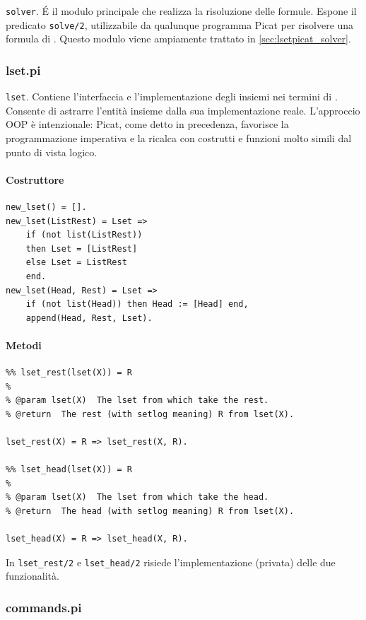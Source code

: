 \documentclass[12pt,a4paper,openright]{book} %
\begin{document}
\verb|solver|. \'E il modulo principale che realizza la risoluzione delle formule. Espone il predicato \verb|solve/2|, utilizzabile da qualunque programma Picat per risolvere una formula di \lset{}. Questo modulo viene ampiamente trattato in \ref{sec:lsetpicat_solver}.

\subsubsection{lset.pi}

\verb|lset|. Contiene l'interfaccia e l'implementazione degli insiemi nei termini di \lset{}. Consente di astrarre l'entità insieme dalla sua implementazione reale. L'approccio OOP è intenzionale: Picat, come detto in precedenza, favorisce la programmazione imperativa e la ricalca con costrutti e funzioni molto simili dal punto di vista logico.

\paragraph{Costruttore}
\begin{verbatim}
new_lset() = [].
new_lset(ListRest) = Lset => 
    if (not list(ListRest)) 
    then Lset = [ListRest]
    else Lset = ListRest
    end.
new_lset(Head, Rest) = Lset =>
    if (not list(Head)) then Head := [Head] end,
    append(Head, Rest, Lset).
\end{verbatim}

\paragraph{Metodi}
\begin{verbatim}
%% lset_rest(lset(X)) = R
%
% @param lset(X)  The lset from which take the rest.
% @return  The rest (with setlog meaning) R from lset(X).

lset_rest(X) = R => lset_rest(X, R).

%% lset_head(lset(X)) = R
%
% @param lset(X)  The lset from which take the head.
% @return  The head (with setlog meaning) R from lset(X).

lset_head(X) = R => lset_head(X, R).
\end{verbatim}
In \verb|lset_rest/2| e \verb|lset_head/2| risiede l'implementazione (privata) delle due funzionalità.

\subsubsection{commands.pi}
\end{document}
